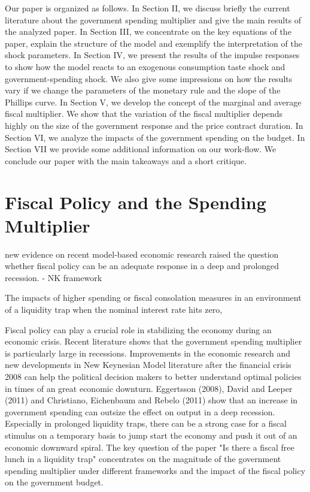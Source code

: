 \documentclass[12pt,a4paper,oneside,titlepage]{article}
\begin{document}
Our paper is organized as follows. In Section II, we discuss briefly the current literature about the government spending multiplier and give the main results of the analyzed paper. In Section III, we concentrate on the key equations of the paper, explain the structure of the model and exemplify the interpretation of the shock parameters. In Section IV, we present the results of the impulse responses to show how the model reacts to an exogenous consumption taste shock and government-spending shock. We also give some impressions on how the results vary if we change the parameters of the monetary rule and the slope of the Phillips curve. In Section V, we develop the concept of the marginal and average fiscal multiplier. We show that the variation of the fiscal multiplier depends highly on the size of the government response and the price contract duration. In Section VI, we analyze the impacts of the government spending on the budget. In Section VII we provide some additional information on our work-flow. We conclude our paper with the main takeaways and a short critique.


\section{Fiscal Policy and the Spending Multiplier }

new evidence on recent model-based economic research raised the question whether fiscal policy can be an adequate response in a deep and prolonged recession.
- NK framework

The impacts of higher spending or fiscal consolation measures in an environment of a liquidity trap when the nominal interest rate hits zero,

Fiscal policy can play a crucial role in stabilizing the economy during an economic crisis. Recent literature shows that the government spending multiplier is particularly large in recessions. Improvements in the economic research and new developments in New Keynesian Model literature after the financial crisis 2008 can help the political decision makers to better understand optimal policies in times of an great economic downturn. Eggertsson (2008), David and Leeper (2011) and Christiano, Eichenbaum and Rebelo (2011) show that an increase in government spending can outsize the effect on output in a deep recession. Especially in prolonged liquidity traps, there can be a strong case for a fiscal stimulus on a temporary basis to jump start the economy and push it out of an economic downward spiral.
The key question of the paper "Is there a fiscal free lunch in a liquidity trap" concentrates on the magnitude of the government spending multiplier under different frameworks and the impact of the fiscal policy on the government budget.
\end{document}

